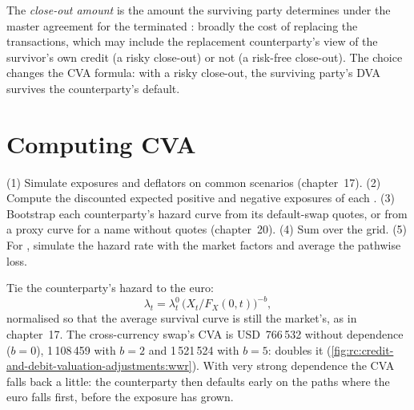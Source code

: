 \begin{definition}\label{def:rc:credit-and-debit-valuation-adjustments:closeout}
The \emph{close-out amount} is the amount the surviving party
determines under the master agreement for the terminated : broadly the cost of
replacing the transactions, which may include the replacement counterparty's view of the
survivor's own credit (a risky close-out) or not (a risk-free close-out). The choice changes the CVA formula: with a risky close-out, the
surviving party's DVA survives the counterparty's default.
\end{definition}

\section{Computing CVA}

\begin{method}\label{met:rc:credit-and-debit-valuation-adjustments:engine}
(1) Simulate exposures and deflators on common scenarios (chapter~17). (2) Compute the
discounted expected positive and negative exposures of each . (3) Bootstrap each
counterparty's hazard curve from its default-swap quotes, or from a proxy curve for a name
without quotes (chapter~20). (4) Sum over the grid. (5) For , simulate the
hazard rate with the market factors and average the pathwise loss.
\end{method}

\begin{example}\label{ex:rc:credit-and-debit-valuation-adjustments:wwr}
Tie the counterparty's hazard to the euro:
\[
\lambda_t = \lambda^0_t\,\bigl(X_t/F_X(0,t)\bigr)^{-b},
\]
normalised so
that the average survival curve is still the market's, as in chapter~17. The cross-currency
swap's CVA is USD~766\,532 without dependence ($b = 0$), 1\,108\,459 with $b = 2$ and 1\,521\,524 with
$b = 5$:  doubles it (\cref{fig:rc:credit-and-debit-valuation-adjustments:wwr}).
With very strong dependence the CVA falls back a little: the counterparty then defaults early
on the paths where the euro falls first, before the exposure has grown.
\end{example}

